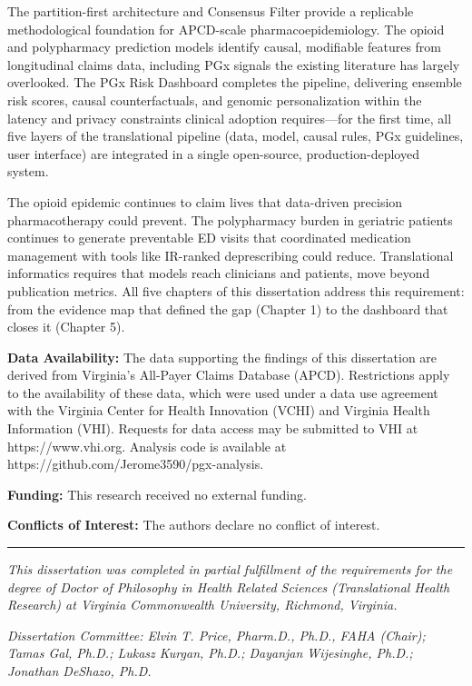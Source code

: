 \documentclass[
  12pt,
]{book}
\begin{document}
The partition-first architecture and Consensus Filter provide a
replicable methodological foundation for APCD-scale
pharmacoepidemiology. The opioid and polypharmacy prediction models
identify causal, modifiable features from longitudinal claims data,
including PGx signals the existing literature has largely overlooked.
The PGx Risk Dashboard completes the pipeline, delivering ensemble risk
scores, causal counterfactuals, and genomic personalization within the
latency and privacy constraints clinical adoption requires---for the
first time, all five layers of the translational pipeline (data, model,
causal rules, PGx guidelines, user interface) are integrated in a single
open-source, production-deployed system.

The opioid epidemic continues to claim lives that data-driven precision
pharmacotherapy could prevent. The polypharmacy burden in geriatric
patients continues to generate preventable ED visits that coordinated
medication management with tools like IR-ranked deprescribing could
reduce. Translational informatics requires that models reach clinicians
and patients, move beyond publication metrics. All five chapters of this
dissertation address this requirement: from the evidence map that
defined the gap (Chapter 1) to the dashboard that closes it (Chapter 5).

\textbf{Data Availability:} The data supporting the findings of this
dissertation are derived from Virginia's All-Payer Claims Database
(APCD). Restrictions apply to the availability of these data, which were
used under a data use agreement with the Virginia Center for Health
Innovation (VCHI) and Virginia Health Information (VHI). Requests for
data access may be submitted to VHI at https://www.vhi.org. Analysis
code is available at https://github.com/Jerome3590/pgx-analysis.

\textbf{Funding:} This research received no external funding.

\textbf{Conflicts of Interest:} The authors declare no conflict of
interest.

\begin{center}\rule{0.5\linewidth}{0.5pt}\end{center}

\emph{This dissertation was completed in partial fulfillment of the
requirements for the degree of Doctor of Philosophy in Health Related
Sciences (Translational Health Research) at Virginia Commonwealth
University, Richmond, Virginia.}

\emph{Dissertation Committee: Elvin T. Price, Pharm.D., Ph.D., FAHA
(Chair); Tamas Gal, Ph.D.; Lukasz Kurgan, Ph.D.; Dayanjan Wijesinghe,
Ph.D.; Jonathan DeShazo, Ph.D.}
\end{document}
